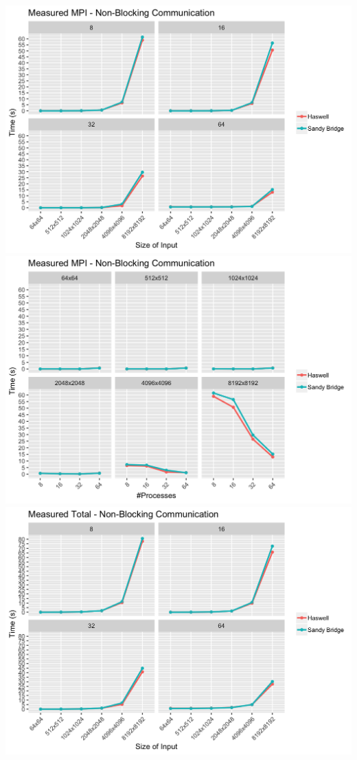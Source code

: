 \documentclass[10pt, letterpaper, twoside]{article}
\begin{document}
\begin{titlepage}
\begin{enumerate}
\vspace{5mm}
\includegraphics[scale = 0.18]{P2P_Measured-MPI_Processes.png}
\includegraphics[scale = 0.18]{P2P_Measured-MPI_InputSize.png}
\vspace{5mm}
\includegraphics[scale = 0.18]{P2P_Measured-Total_Processes.png}

\end{enumerate}
\end{titlepage}
\end{document}
